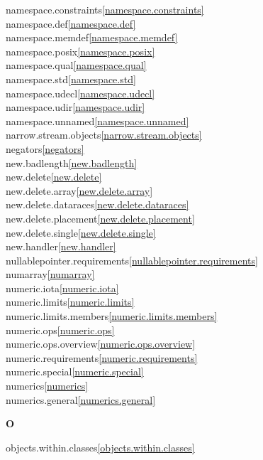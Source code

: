 \begin{multicols}{2}
namespace.constraints\quad\ref{namespace.constraints}\\
namespace.def\quad\ref{namespace.def}\\
namespace.memdef\quad\ref{namespace.memdef}\\
namespace.posix\quad\ref{namespace.posix}\\
namespace.qual\quad\ref{namespace.qual}\\
namespace.std\quad\ref{namespace.std}\\
namespace.udecl\quad\ref{namespace.udecl}\\
namespace.udir\quad\ref{namespace.udir}\\
namespace.unnamed\quad\ref{namespace.unnamed}\\
narrow.stream.objects\quad\ref{narrow.stream.objects}\\
negators\quad\ref{negators}\\
new.badlength\quad\ref{new.badlength}\\
new.delete\quad\ref{new.delete}\\
new.delete.array\quad\ref{new.delete.array}\\
new.delete.dataraces\quad\ref{new.delete.dataraces}\\
new.delete.placement\quad\ref{new.delete.placement}\\
new.delete.single\quad\ref{new.delete.single}\\
new.handler\quad\ref{new.handler}\\
nullablepointer.requirements\quad\ref{nullablepointer.requirements}\\
numarray\quad\ref{numarray}\\
numeric.iota\quad\ref{numeric.iota}\\
numeric.limits\quad\ref{numeric.limits}\\
numeric.limits.members\quad\ref{numeric.limits.members}\\
numeric.ops\quad\ref{numeric.ops}\\
numeric.ops.overview\quad\ref{numeric.ops.overview}\\
numeric.requirements\quad\ref{numeric.requirements}\\
numeric.special\quad\ref{numeric.special}\\
numerics\quad\ref{numerics}\\
numerics.general\quad\ref{numerics.general}\\
\par \textbf{O}\par
objects.within.classes\quad\ref{objects.within.classes}\\

\end{multicols}
